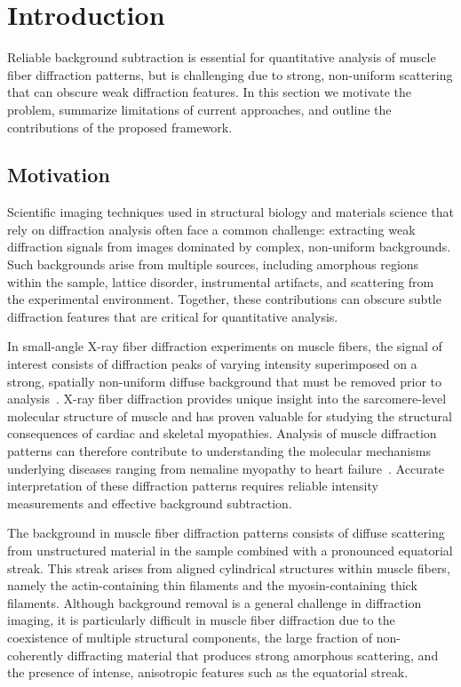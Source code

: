 \documentclass[iucr,review]{iucrjournals}
\begin{document}


\section{Introduction}

Reliable background subtraction is essential for quantitative analysis of muscle fiber diffraction patterns, but is challenging due to strong, non-uniform scattering that can obscure weak diffraction features. In this section we motivate the problem, summarize limitations of current approaches, and outline the contributions of the proposed framework.


\subsection{Motivation}

Scientific imaging techniques used in structural biology and materials science that rely on diffraction analysis often face a common challenge: extracting weak diffraction signals from images dominated by complex, non-uniform backgrounds. Such backgrounds arise from multiple sources, including amorphous regions within the sample, lattice disorder, instrumental artifacts, and scattering from the experimental environment. Together, these contributions can obscure subtle diffraction features that are critical for quantitative analysis.

In small-angle X-ray fiber diffraction experiments on muscle fibers, the signal of interest consists of diffraction peaks of varying intensity superimposed on a strong, spatially non-uniform diffuse background that must be removed prior to analysis~\cite{ResearchPlanMusico}. X-ray fiber diffraction provides unique insight into the sarcomere-level molecular structure of muscle and has proven valuable for studying the structural consequences of cardiac and skeletal myopathies. Analysis of muscle diffraction patterns can therefore contribute to understanding the molecular mechanisms underlying diseases ranging from nemaline myopathy to heart failure~\cite{MaIrving2022}. Accurate interpretation of these diffraction patterns requires reliable intensity measurements and effective background subtraction.

The background in muscle fiber diffraction patterns consists of diffuse scattering from unstructured material in the sample combined with a pronounced equatorial streak. This streak arises from aligned cylindrical structures within muscle fibers, namely the actin-containing thin filaments and the myosin-containing thick filaments. Although background removal is a general challenge in diffraction imaging, it is particularly difficult in muscle fiber diffraction due to the coexistence of multiple structural components, the large fraction of non-coherently diffracting material that produces strong amorphous scattering, and the presence of intense, anisotropic features such as the equatorial streak.
\end{document}
